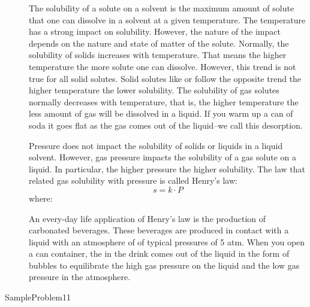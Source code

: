 \documentclass[main.tex]{subfiles}
\newcommand\chapterlabel{Ch-solutions}\setcounter{figurenewcounter}{0}\setcounter{tablenewcounter}{0}\setcounter{formulanewcounter}{0}
\begin{document}
\begin{description}
\item[] The solubility of a solute on a solvent is the maximum amount of solute that one can dissolve in a solvent at a given temperature. The temperature has a strong impact on solubility. However, the nature of the impact depends on the nature and state of matter of the solute.
Normally, the solubility of solids increases with temperature. That means the higher temperature the more solute one can dissolve. However, this trend is not true for all solid solutes. Solid solutes like  or  follow the opposite trend the higher temperature the lower solubility. 
The solubility of gas solutes normally decreases with temperature, that is, the higher temperature the less amount of gas will be dissolved in a liquid. If you warm up a can of soda it goes flat as the gas comes out of the liquid--we call this desorption. 
\item[] Pressure does not impact the solubility of solids or liquids in a liquid solvent. However, gas pressure impacts the solubility of a gas solute on a liquid. In particular, the higher pressure the higher solubility. The law that related gas solubility with pressure is called Henry's law:
\begin{equation}
\boxed{ s=k\cdot P 	}
\label{\chapterlabel:equation14}
\end{equation}
where:
An every-day life application of Henry's law is the production of carbonated beverages. These beverages are produced in contact with a liquid with an atmosphere of  of typical pressures of 5 atm. When you open a can container, the  in the drink comes out of the liquid in the form of bubbles to equilibrate the high gas pressure on the liquid and the low gas pressure in the atmosphere.
\end{description}

{SampleProblem11}
\end{document}
